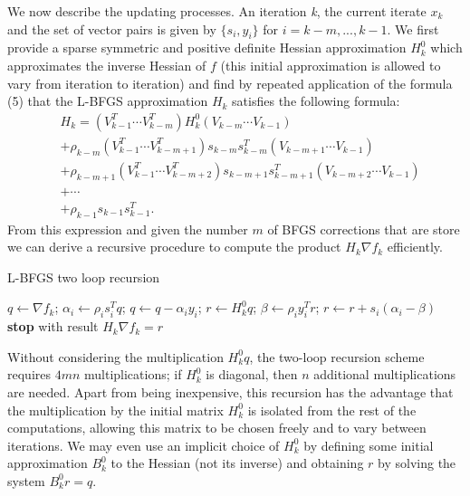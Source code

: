 We now describe the updating processes. An iteration \textit{k}, the current iterate $x_{k}$ and the set of vector pairs is given by $\{s_{i},y_{i}\}$ for $i=k-m, ..., k-1$. We first provide a sparse symmetric and positive definite Hessian approximation $H^0_{k}$ which approximates the inverse Hessian of $f$ 
(this initial approximation is allowed to vary from iteration to iteration) and find by repeated application of the formula (5) that the L-BFGS approximation $H_{k}$ satisfies the following formula: 
\begin{equation} 
\begin{aligned}
&H_{k}=(V^T_{k-1}\cdots V^T_{k-m})H^0_{k}(V_{k-m}\cdots V_{k-1})\\           
&+\rho_{k-m}(V^T_{k-1}\cdots V^T_{k-m+1})s_{k-m}s^T_{k-m}(V_{k-m+1}\cdots V_{k-1})\\
&+\rho_{k-m+1}(V^T_{k-1}\cdots V^T_{k-m+2})s_{k-m+1}s^T_{k-m+1}(V_{k-m+2}\cdots V_{k-1})\\
&+ \cdots \\
&+\rho_{k-1}s_{k-1}s^T_{k-1}.  
\end{aligned}
\end{equation}
From this expression and given the number $m$ of BFGS corrections that are store we can derive a recursive procedure to compute the product $H_{k}\nabla f_{k}$ efficiently.

\begin{algorithm}[H]
	\caption{L-BFGS two loop recursion}
	\label{}
	\begin{algorithmic}[3]
	
		\State $q \gets \nabla f_{k}$;
        \State $ \alpha_{i} \gets \rho_{i}s^T_{i}q$;
        \State $q \gets q - \alpha_{i}y_{i}$; 
      \EndFor
 	  \State $r \gets H^0_{k}q$;
 	  \State $\beta \gets \rho_{i}y^T_{i}r$; 
 	  \State $r \gets r + s_{i}(\alpha_{i}-\beta)$
 	  \EndFor
	  \State \textbf{stop} with result $H_{k}\nabla f_{k}=r$
	\end{algorithmic}
\end{algorithm}
Without considering the multiplication $H^0_{k}q $, the two-loop recursion scheme requires $4mn$ multiplications; if $H^0_{k}$ is diagonal, then $n$ additional multiplications are needed. Apart from being inexpensive, this recursion has the advantage that the multiplication by the initial matrix $H^0_{k}$ is isolated from the rest of the computations, allowing this matrix to be chosen freely and to vary between iterations. We may even use an implicit choice of $H^0_{k}$ by defining some initial approximation $B^0_{k}$ to the Hessian (not its inverse) and obtaining $r$ by solving the system $B^0_{k}r = q$. 

